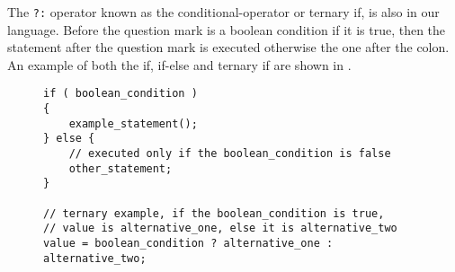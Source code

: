The \texttt{?:} operator known as the conditional-operator or ternary if, is also in our language. 
Before the question mark is a boolean condition if it is true, then the statement after the question mark is executed otherwise the one after the colon. 
An example of both the if, if-else and ternary if are shown in .
\begin{figure}[h]
\begin{lstlisting}[caption=An example of the conditional operators., label=lst:condExample]
if ( boolean_condition )
{
    example_statement();
} else {
    // executed only if the boolean_condition is false
    other_statement;
}

// ternary example, if the boolean_condition is true,
// value is alternative_one, else it is alternative_two
value = boolean_condition ? alternative_one : alternative_two;

\end{lstlisting}
\end{figure}
